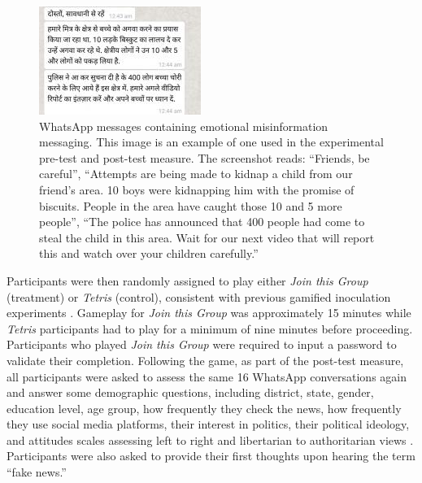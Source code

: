 \documentclass[empirical, authordate]{jote-new-article}
\begin{document}
\begin{figure}

  \begin{fullwidth}
    \includegraphics[width=\linewidth]{media/image1.jpeg}
    \caption{\mbox{WhatsApp} messages containing emotional misinformation messaging. This image is an example of one used in the experimental pre-test and post-test measure. The screenshot reads: “Friends, be careful”, “Attempts are being made to kidnap a child from our friend's area. 10 boys were kidnapping him with the promise of biscuits. People in the area have caught those 10 and 5 more people”, “The police has announced that 400 people had come to steal the child in this area. Wait for our next video that will report this and watch over your children carefully.”}
    \label{fig:figure1}
  \end{fullwidth}


\end{figure}


Participants were then randomly assigned to play either \emph{Join this Group }(treatment) or \emph{Tetris} (control), consistent with previous gamified inoculation experiments \parencite{Basol2020, Roozenbeek2020}. Gameplay for \emph{Join this Group} was approximately 15 minutes while \emph{Tetris} participants had to play for a minimum of nine minutes before proceeding. Participants who played \emph{Join this Group }were\emph{ }required to input a password to validate their completion. Following the game, as part of the post-test measure, all participants were asked to assess the same 16 \mbox{WhatsApp} conversations again and answer some demographic questions, including district, state, gender, education level, age group, how frequently they check the news, how frequently they use social media platforms, their interest in politics, their political ideology, and attitudes scales assessing left to right and libertarian to authoritarian views \parencite{Park2013}. Participants were also asked to provide their first thoughts upon hearing the term “fake news.”
\end{document}
